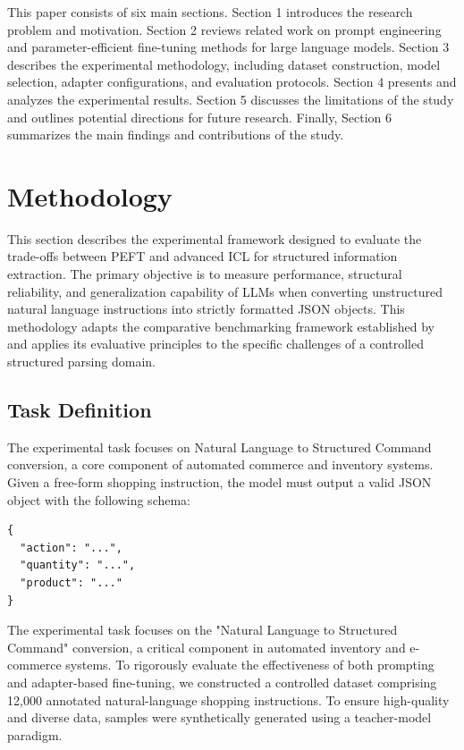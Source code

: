 \documentclass[journal,article,submit,pdftex,moreauthors]{Definitions/mdpi}
\begin{document}

This paper consists of six main sections. Section 1 introduces the research problem and motivation. Section 2 reviews related work on prompt engineering and parameter-efficient fine-tuning methods for large language models. Section 3 describes the experimental methodology, including dataset construction, model selection, adapter configurations, and evaluation protocols. Section 4 presents and analyzes the experimental results. Section 5 discusses the limitations of the study and outlines potential directions for future research. Finally, Section 6 summarizes the main findings and contributions of the study.

\section{Methodology}

This section describes the experimental framework designed to evaluate the trade-offs between PEFT and advanced ICL for structured information extraction. The primary objective is to measure performance, structural reliability, and generalization capability of LLMs when converting unstructured natural language instructions into strictly formatted JSON objects. This methodology adapts the comparative benchmarking framework established by \citep{karlovic2025large} and applies its evaluative principles to the specific challenges of a controlled structured parsing domain.

\subsection{Task Definition}

The experimental task focuses on Natural Language to Structured Command conversion, a core component of automated commerce and inventory systems. Given a free-form shopping instruction, the model must output a valid JSON object with the following schema:

\begin{verbatim}
{
  "action": "...",
  "quantity": "...",
  "product": "..."
}
\end{verbatim}

The experimental task focuses on the "Natural Language to Structured Command" conversion, a critical component in automated inventory and e-commerce systems. To rigorously evaluate the effectiveness of both prompting and adapter-based fine-tuning, we constructed a controlled dataset comprising 12,000 annotated natural-language shopping instructions. To ensure high-quality and diverse data, samples were synthetically generated using a teacher-model paradigm.
\end{document}
